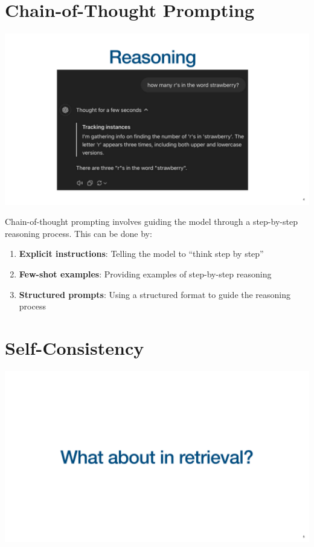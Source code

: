 \documentclass[
  letterpaper,
  oneside]{scrbook}
\providecommand{\tightlist}{%
  \setlength{\itemsep}{0pt}\setlength{\parskip}{0pt}}\usepackage{longtable,booktabs,array}
\begin{document}
\section{Chain-of-Thought Prompting}\label{chain-of-thought-prompting}

\includegraphics{chapters/../p3-images/slide_5.png}

Chain-of-thought prompting involves guiding the model through a
step-by-step reasoning process. This can be done by:

\begin{enumerate}
\def\labelenumi{\arabic{enumi}.}
\tightlist
\item
  \textbf{Explicit instructions}: Telling the model to ``think step by
  step''
\item
  \textbf{Few-shot examples}: Providing examples of step-by-step
  reasoning
\item
  \textbf{Structured prompts}: Using a structured format to guide the
  reasoning process
\end{enumerate}

\section{Self-Consistency}\label{self-consistency}

\includegraphics{chapters/../p3-images/slide_6.png}
\end{document}
